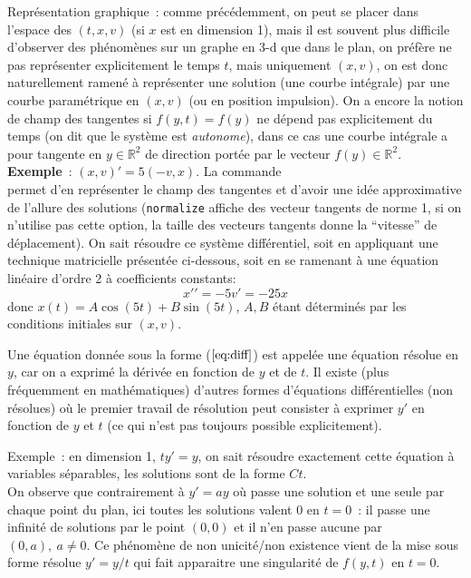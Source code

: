 \documentclass[a4paper,11pt]{article}
\begin{document}
\begin{giacjshere}
Repr\'esentation graphique~: comme pr\'ec\'edemment,
on peut se placer dans l'espace
des $(t,x,v)$ (si $x$ est en dimension 1), mais il est souvent
plus difficile d'observer des ph\'enom\`enes sur un graphe
en 3-d que dans le plan, on pr\'ef\`ere ne pas repr\'esenter explicitement le
temps $t$, mais uniquement $(x,v)$, on est donc naturellement
ramen\'e \`a repr\'esenter une solution (une courbe int\'egrale)
par une courbe param\'etrique en $(x,v)$ (ou en position
impulsion). On a encore la notion de champ des tangentes
si $f(y,t)=f(y)$ ne d\'epend pas explicitement du temps
(on dit que le syst\`eme est {\em autonome}), dans ce
cas une courbe int\'egrale a pour tangente en $y\in \mathbb{R}^2$ 
de direction port\'ee par le vecteur $f(y) \in \mathbb{R}^2$.\\
{\bf Exemple}~: $(x,v)'=5(-v,x)$. La commande \\
permet d'en repr\'esenter le champ des tangentes
et d'avoir une id\'ee approximative de l'allure des solutions
(\verb|normalize| affiche des vecteur tangents de norme 1, si
on n'utilise pas cette option, la taille des vecteurs tangents donne
la ``vitesse'' de d\'eplacement).
On sait r\'esoudre ce syst\`eme diff\'erentiel, soit en appliquant
une technique matricielle pr\'esent\'ee ci-dessous, 
soit en se ramenant \`a une \'equation
lin\'eaire d'ordre 2 \`a coefficients constants:
$$ x'{'}=-5v'=-25x$$
donc $x(t)=A\cos(5t)+B\sin(5t)$, $A, B$ \'etant d\'etermin\'es
par les conditions initiales sur $(x,v)$.

Une \'equation donn\'ee sous la forme (\(\ref{eq:diff}\)) 
est appel\'ee une \'equation r\'esolue en $y$,
car on a exprim\'e la d\'eriv\'ee en fonction de $y$ et de $t$. Il
existe (plus fr\'equemment en math\'ematiques) d'autres formes d'\'equations
diff\'erentielles (non r\'esolues) o\`u le premier travail de r\'esolution
peut consister \`a exprimer
$y'$ en fonction de $y$ et $t$ (ce qui n'est pas toujours possible 
explicitement).

Exemple~: en dimension 1, $ty'=y$, on sait r\'esoudre exactement
cette \'equation \`a variables s\'eparables, les solutions sont de la 
forme $Ct$.\\
On observe que contrairement \`a $y'=ay$
o\`u passe une solution et une seule par chaque point du plan,
ici toutes les solutions valent 0 en $t=0$~: il passe une
infinit\'e de solutions par le point $(0,0)$ et il n'en passe aucune
par $(0,a), \ a \neq 0$. Ce ph\'enom\`ene de non unicit\'e/non
existence vient de la mise sous forme r\'esolue $y'=y/t$ qui
fait apparaitre une singularit\'e de $f(y,t)$ en $t=0$.


\end{giacjshere}
\end{document}
